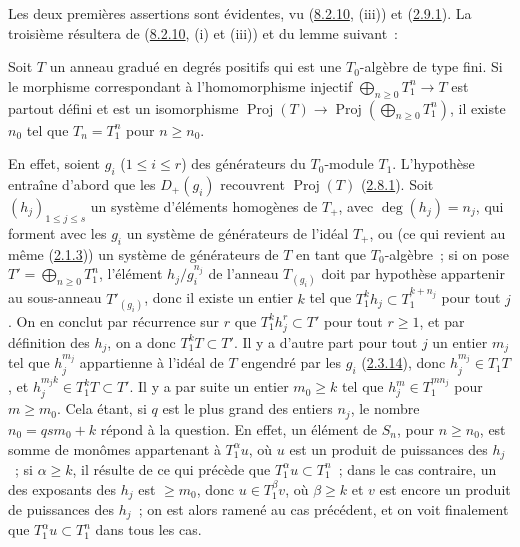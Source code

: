 Les deux premières assertions sont évidentes, vu
(\hyperref[II.8.2.10-fr]{8.2.10}, (iii)) et
(\hyperref[II.2.9.1-fr]{2.9.1}). La troisième résultera de
(\hyperref[II.8.2.10-fr]{8.2.10}, (i) et (iii)) et du lemme suivant~:

\begin{lemma}[8.2.14.1]
\label{II.8.2.14.1-fr}
Soit $T$ un anneau gradué en degrés positifs qui est une $T_0$-algèbre de type
fini. Si le morphisme correspondant à l'homomorphisme injectif
$\bigoplus_{n\geq0}T_1^n\to T$ est partout défini et est un isomorphisme
$\operatorname{Proj}(T)\to\operatorname{Proj}\left(\bigoplus_{n\geq0}T_1^n\right)$,
il existe $n_0$ tel que $T_n=T_1^n$ pour $n\geq n_0$.
\end{lemma}

En effet, soient $g_i$ ($1\leq i\leq r$) des générateurs du $T_0$-module
$T_1$. L'hypothèse entraîne d'abord que les $D_+(g_i)$ recouvrent
$\operatorname{Proj}(T)$ (\hyperref[II.2.8.1-fr]{2.8.1}). Soit
$(h_j)_{1\leq j\leq s}$ un système d'éléments homogènes de $T_+$, avec
$\deg(h_j)=n_j$, qui forment avec les $g_i$ un système de générateurs de
l'idéal $T_+$, ou (ce qui revient au même
(\hyperref[II.2.1.3-fr]{2.1.3})) un système de générateurs de $T$ en tant que
$T_0$-algèbre~; si on pose $T'=\bigoplus_{n\geq0}T_1^n$, l'élément
$h_j/g_i^{n_j}$ de l'anneau $T_{(g_i)}$ doit par hypothèse appartenir au
sous-anneau $T'_{(g_i)}$, donc il existe un entier $k$ tel que
$T_1^k h_j\subset T_1^{k+n_j}$ pour tout $j$. On en conclut par récurrence
sur $r$ que $T_1^k h_j^r\subset T'$ pour tout $r\geq1$, et par définition des
$h_j$, on a donc $T_1^kT\subset T'$. Il y a d'autre part pour tout $j$ un
entier $m_j$ tel que $h_j^{m_j}$ appartienne à l'idéal de $T$ engendré par
les $g_i$ (\hyperref[II.2.3.14-fr]{2.3.14}), donc $h_j^{m_j}\in T_1T$, et
$h_j^{m_jk}\in T_1^kT\subset T'$. Il y a par suite un entier $m_0\geq k$ tel
que $h_j^m\in T_1^{mn_j}$ pour $m\geq m_0$. Cela étant, si $q$ est le plus
grand des entiers $n_j$, le nombre $n_0=qsm_0+k$ répond à la question. En
effet, un élément de $S_n$, pour $n\geq n_0$, est somme de monômes appartenant
à $T_1^\alpha u$, où $u$ est un produit de puissances des $h_j$~; si
$\alpha\geq k$, il résulte de ce qui précède que $T_1^\alpha u\subset T_1^n$~;
dans le cas contraire, un des exposants des $h_j$ est $\geq m_0$, donc
$u\in T_1^\beta v$, où $\beta\geq k$ et $v$ est encore un produit de
puissances des $h_j$~; on est alors ramené au cas précédent, et on voit
finalement que $T_1^\alpha u\subset T_1^n$ dans tous les cas.

